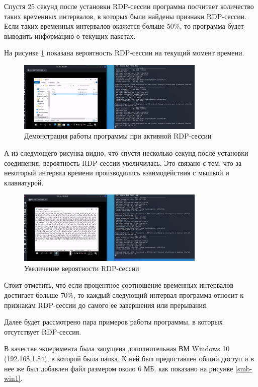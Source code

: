 \documentclass[bachelor, och, coursework]{SCWorks}
\begin{document}
Спустя 25 секунд после установки RDP-сессии программа посчитает количество таких временных интервалов, в которых были найдены
признаки RDP-сессии. Если таких временных интервалов окажется больше 50\%, то программа будет выводить информацию о текущих пакетах.

На рисунке \ref{rdpport3} показана вероятность RDP-сессии на текущий момент времени.

\begin{figure}[H]
  \centering
  \includegraphics[width=0.8\textwidth]{photo/rdpport3.jpg}
  \caption{Демонстрация работы программы при активной RDP-сессии}
  \label{rdpport3}
\end{figure}

А из следующего рисунка видно, что спустя несколько секунд после установки соединения, вероятность RDP-сессии увеличилась.
Это связано с тем, что за некоторый интервал времени производились взаимодействия с мышкой и клавиатурой.


\begin{figure}[H]
  \centering
  \includegraphics[width=0.8\textwidth]{photo/rdpport4.jpg}
  \caption{Увеличение вероятности RDP-сессии}
  \label{rdpport4}
\end{figure}

Стоит отметить, что если процентное соотношение временных интервалов достигает больше 70\%, то каждый следующий интервал программа
относит к признакам RDP-сессии до самого ее завершения или прерывания.

Далее будет рассмотрено пара примеров работы программы, в которых отсутствует RDP-сессия.

В качестве экперимента была запущена дополнительная ВМ Windows 10 (192.168.1.84), в которой была папка. К ней был предоставлен
общий доступ и в нее же был добавлен файл размером около 6 МБ, как показано
на рисунке \ref{smb-win1}.
\end{document}
